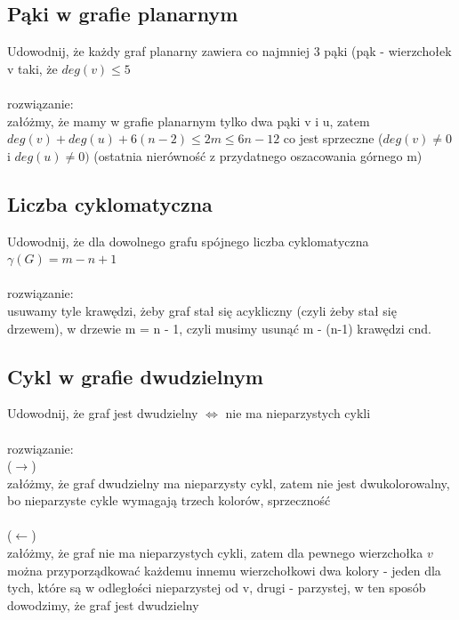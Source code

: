 \documentclass{article}
\begin{document}
\subsection*{Pąki w grafie planarnym}
Udowodnij, że każdy graf planarny zawiera co najmniej 3 pąki (pąk - wierzchołek v taki, że $deg(v) \leq 5$ \\\\
rozwiązanie:\\
załóżmy, że mamy w grafie planarnym tylko dwa pąki v i u,  zatem 
$deg(v) + deg(u) + 6(n-2) \leq 2m \leq 6n - 12 $ co jest sprzeczne ($deg(v) \ne 0$ i $deg(u) \ne 0)$ (ostatnia nierówność z przydatnego oszacowania górnego m) 

\subsection*{Liczba cyklomatyczna}
Udowodnij, że dla dowolnego grafu spójnego liczba cyklomatyczna $\gamma(G) = m - n + 1$ \\\\ rozwiązanie: \\
usuwamy tyle krawędzi, żeby graf stał się acykliczny (czyli żeby stał się drzewem), w drzewie m = n - 1, czyli musimy usunąć m - (n-1) krawędzi cnd. 

\subsection*{Cykl w grafie dwudzielnym}
Udowodnij, że graf jest dwudzielny $\iff$ nie ma nieparzystych cykli \\\\rozwiązanie:\\
($\rightarrow$)\\
załóżmy, że graf dwudzielny ma nieparzysty cykl, zatem nie jest dwukolorowalny, bo nieparzyste cykle wymagają 
trzech kolorów, sprzeczność \\\\
($\leftarrow$) \\
załóżmy, że graf nie ma nieparzystych cykli, zatem dla pewnego wierzchołka $v$ można przyporządkować każdemu innemu wierzchołkowi dwa kolory - jeden dla tych, które są w odległości nieparzystej od v, drugi - parzystej, w ten sposób dowodzimy, że graf jest dwudzielny
\end{document}
